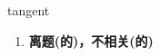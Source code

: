 
\begin{frame}
{\huge tangent}
\begin{center}
\begin{enumerate}\Large
  \item \textbf{离题(的)，不相关(的)}
\end{enumerate}
\end{center}
\end{frame}
